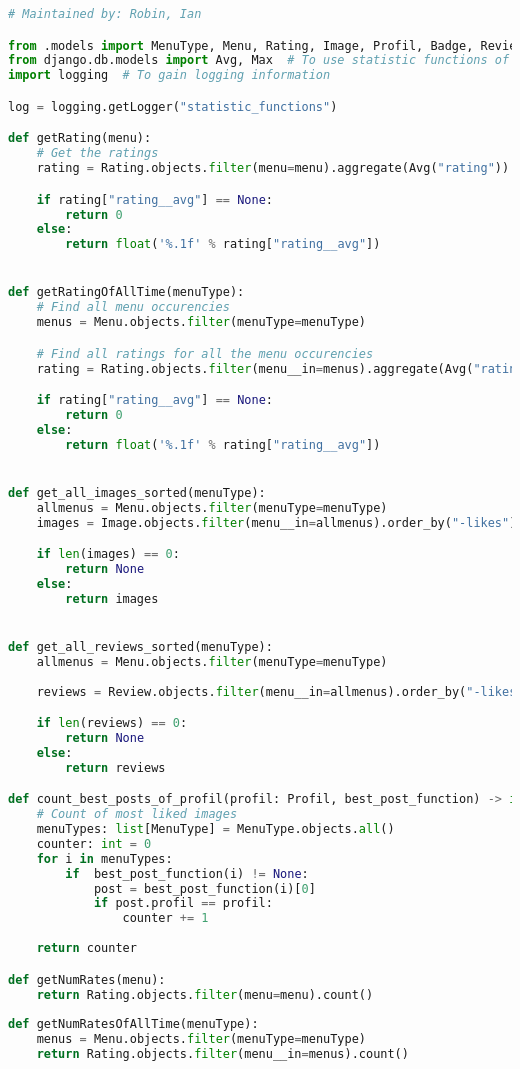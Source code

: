 \begin{lstlisting}[language=Python]
# Maintained by: Robin, Ian

from .models import MenuType, Menu, Rating, Image, Profil, Badge, Review  # To have access to the database
from django.db.models import Avg, Max  # To use statistic functions of the database
import logging  # To gain logging information

log = logging.getLogger("statistic_functions")

def getRating(menu):
    # Get the ratings
    rating = Rating.objects.filter(menu=menu).aggregate(Avg("rating"))

    if rating["rating__avg"] == None:
        return 0
    else:
        return float('%.1f' % rating["rating__avg"])


def getRatingOfAllTime(menuType):
    # Find all menu occurencies
    menus = Menu.objects.filter(menuType=menuType)

    # Find all ratings for all the menu occurencies
    rating = Rating.objects.filter(menu__in=menus).aggregate(Avg("rating"))

    if rating["rating__avg"] == None:
        return 0
    else:
        return float('%.1f' % rating["rating__avg"])


def get_all_images_sorted(menuType):
    allmenus = Menu.objects.filter(menuType=menuType)
    images = Image.objects.filter(menu__in=allmenus).order_by("-likes")

    if len(images) == 0:
        return None
    else:
        return images


def get_all_reviews_sorted(menuType):
    allmenus = Menu.objects.filter(menuType=menuType)
        
    reviews = Review.objects.filter(menu__in=allmenus).order_by("-likes")

    if len(reviews) == 0:
        return None
    else:
        return reviews

def count_best_posts_of_profil(profil: Profil, best_post_function) -> int:
    # Count of most liked images
    menuTypes: list[MenuType] = MenuType.objects.all()
    counter: int = 0
    for i in menuTypes:
        if  best_post_function(i) != None:
            post = best_post_function(i)[0]
            if post.profil == profil:
                counter += 1
    
    return counter

def getNumRates(menu):
    return Rating.objects.filter(menu=menu).count()
    
def getNumRatesOfAllTime(menuType):
    menus = Menu.objects.filter(menuType=menuType)
    return Rating.objects.filter(menu__in=menus).count()


\end{lstlisting}

